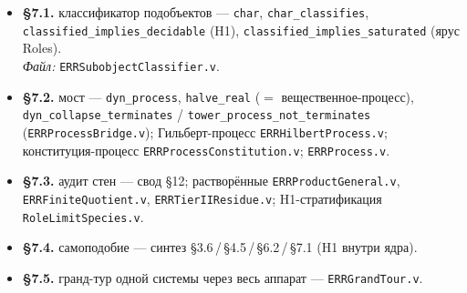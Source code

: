 \documentclass[12pt,a4paper]{article}
\begin{document}
\begin{itemize}\itemsep2pt
\item \textbf{§7.1.} классификатор подобъектов --- \texttt{char}, \texttt{char\_classifies},
\texttt{classified\_implies\_decidable} (H1), \texttt{classified\_implies\_saturated} (ярус Roles).\\
\emph{Файл:} \texttt{ERRSubobjectClassifier.v}.

\item \textbf{§7.2.} мост --- \texttt{dyn\_process}, \texttt{halve\_real} ($=$ вещественное-процесс),
\texttt{dyn\_collapse\_terminates} / \texttt{tower\_process\_not\_terminates}
(\texttt{ERRProcessBridge.v}); Гильберт-процесс \texttt{ERRHilbertProcess.v}; конституция-процесс
\texttt{ERRProcessConstitution.v}; \texttt{ERRProcess.v}.

\item \textbf{§7.3.} аудит стен --- свод §12; растворённые \texttt{ERRProductGeneral.v},
\texttt{ERRFiniteQuotient.v}, \texttt{ERRTierIIResidue.v}; H1-стратификация
\texttt{RoleLimitSpecies.v}.

\item \textbf{§7.4.} самоподобие --- синтез §3.6\,/\,§4.5\,/\,§6.2\,/\,§7.1 (H1 внутри ядра).

\item \textbf{§7.5.} гранд-тур одной системы через весь аппарат --- \texttt{ERRGrandTour.v}.
\end{itemize}
\normalsize

\end{document}
